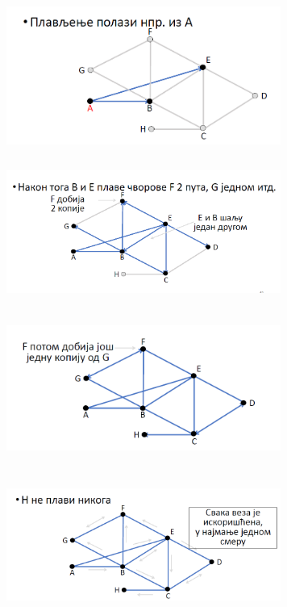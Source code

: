 \documentclass{article} %
\begin{document}
\break
\begin{center}
		\includegraphics[width=9cm, height=5cm]{plavljenje1}\\
		\vskip 10mm
		\includegraphics[width=9cm, height=5cm]{plavljenje2}\\
		\vskip 10mm
		\includegraphics[width=9cm, height=5cm]{plavljenje3}\\
		\vskip 10mm
		\includegraphics[width=9cm, height=5cm]{plavljenje4}\\
		\vskip 10mm
		
\end{center}
\end{document}
